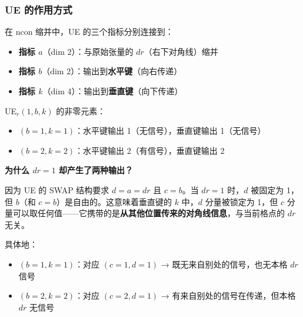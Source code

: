\documentclass[12pt,a4paper]{article}
\begin{document}
\subsubsection{UE 的作用方式}

在 ncon 缩并中，UE 的三个指标分别连接到：
\begin{itemize}
  \item \textbf{指标 $a$}（dim 2）：与原始张量的 $dr$（右下对角线）缩并
  \item \textbf{指标 $b$}（dim 2）：输出到\textbf{水平键}（向右传递）
  \item \textbf{指标 $k$}（dim 4）：输出到\textbf{垂直键}（向下传递）
\end{itemize}

\begin{center}
\end{center}

\begin{exbox}[具体例子：当 $dr = 1$（无对角线信号）时]
UE$_r(1, b, k)$ 的非零元素：
\begin{itemize}
  \item $(b{=}1, k{=}1)$：水平键输出 1（无信号），垂直键输出 1（无信号）
  \item $(b{=}2, k{=}2)$：水平键输出 2（有信号），垂直键输出 2
\end{itemize}

\textbf{为什么 $dr=1$ 却产生了两种输出？}

因为 UE 的 SWAP 结构要求 $d = a = dr$ 且 $c = b$。当 $dr = 1$ 时，$d$ 被固定为 1，但 $b$（和 $c=b$）是自由的。这意味着垂直键的 $k$ 中，$d$ 分量被锁定为 1，但 $c$ 分量可以取任何值——它携带的是\textbf{从其他位置传来的对角线信息}，与当前格点的 $dr$ 无关。

具体地：
\begin{itemize}
  \item $(b{=}1, k{=}1)$：对应 $(c{=}1, d{=}1)$ → 既无来自别处的信号，也无本格 $dr$ 信号
  \item $(b{=}2, k{=}2)$：对应 $(c{=}2, d{=}1)$ → 有来自别处的信号在传递，但本格 $dr$ 无信号
\end{itemize}
\end{exbox}
\end{document}
